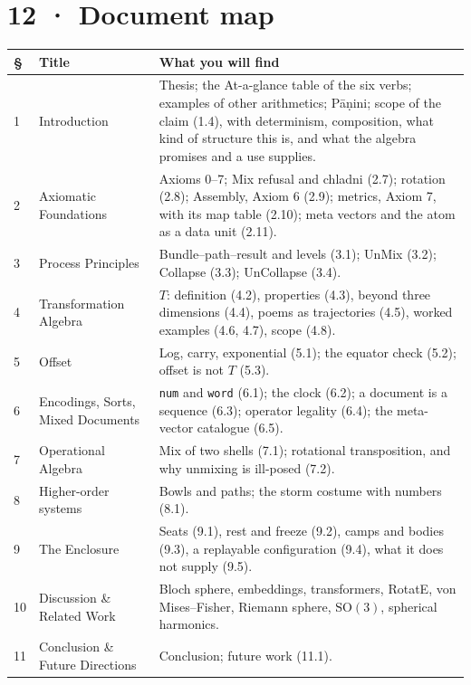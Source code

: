 \documentclass[10.5pt]{article}
\begin{document}
\section*{12 · Document map}
{\small\setlength{\tabcolsep}{4pt}\begin{longtable}{L{1.0cm}L{5.0cm}L{10.3cm}}
\toprule
\textbf{§} & \textbf{Title} & \textbf{What you will find} \\
\midrule
{} & Introduction & Thesis; the At-a-glance table of the six verbs; examples of other arithmetics; Pāṇini; scope of the claim (1.4), with determinism, composition, what kind of structure this is, and what the algebra promises and a use supplies. \\
2 & Axiomatic Foundations & Axioms 0--7; Mix refusal and chladni (2.7); rotation (2.8); Assembly, Axiom 6 (2.9); metrics, Axiom 7, with its map table (2.10); meta vectors and the atom as a data unit (2.11). \\
3 & Process Principles & Bundle--path--result and levels (3.1); UnMix (3.2); Collapse (3.3); UnCollapse (3.4). \\
4 & Transformation Algebra & $T$: definition (4.2), properties (4.3), beyond three dimensions (4.4), poems as trajectories (4.5), worked examples (4.6, 4.7), scope (4.8). \\
5 & Offset & Log, carry, exponential (5.1); the equator check (5.2); offset is not $T$ (5.3). \\
6 & Encodings, Sorts, Mixed Documents & \texttt{num} and \texttt{word} (6.1); the clock (6.2); a document is a sequence (6.3); operator legality (6.4); the meta-vector catalogue (6.5). \\
7 & Operational Algebra & Mix of two shells (7.1); rotational transposition, and why unmixing is ill-posed (7.2). \\
8 & Higher-order systems & Bowls and paths; the storm costume with numbers (8.1). \\
9 & The Enclosure & Seats (9.1), rest and freeze (9.2), camps and bodies (9.3), a replayable configuration (9.4), what it does not supply (9.5). \\
10 & Discussion \& Related Work & Bloch sphere, embeddings, transformers, RotatE, von Mises--Fisher, Riemann sphere, $\mathrm{SO}(3)$, spherical harmonics. \\
11 & Conclusion \& Future Directions & Conclusion; future work (11.1). \\
\bottomrule
\end{longtable}}
\end{document}
